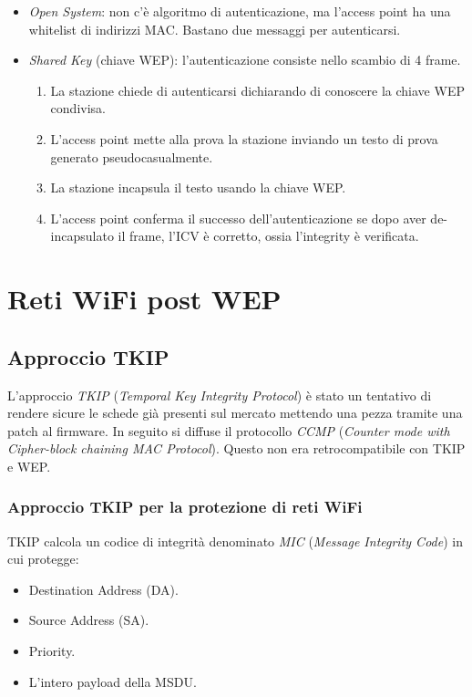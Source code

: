 \documentclass[14pt]{extreport}
\begin{document}
\begin{itemize}
    \item \textit{Open System}: non c'è algoritmo di autenticazione, ma l'access point ha una whitelist di indirizzi MAC. Bastano due messaggi per autenticarsi.
    
    \item \textit{Shared Key} (chiave WEP): l'autenticazione consiste nello scambio di 4 frame.
    
    \begin{enumerate}
        \item La stazione chiede di autenticarsi dichiarando di conoscere la chiave WEP condivisa.
        
        \item L'access point mette alla prova la stazione inviando un testo di prova generato pseudocasualmente.
        
        \item La stazione incapsula il testo usando la chiave WEP.
        
        \item L'access point conferma il successo dell'autenticazione se dopo aver de-incapsulato il frame, l'ICV è corretto, ossia l'integrity è verificata.
    \end{enumerate} 
\end{itemize}

\section{Reti WiFi post WEP}
\subsection{Approccio TKIP}
L'approccio \textit{TKIP} (\textit{Temporal Key Integrity Protocol}) è stato un tentativo di rendere sicure le schede già presenti sul mercato mettendo una pezza tramite una patch al firmware. In seguito si diffuse il protocollo \textit{CCMP} (\textit{Counter mode with Cipher-block chaining MAC Protocol}). Questo non era retrocompatibile con TKIP e WEP.


\subsubsection{Approccio TKIP per la protezione di reti WiFi}
TKIP calcola un codice di integrità denominato \textit{MIC} (\textit{Message Integrity Code}) in cui protegge:


\begin{itemize}
    \item Destination Address (DA).
    
    \item Source Address (SA).
    
    \item Priority.
    
    \item L'intero payload della MSDU.
\end{itemize}
\end{document}
